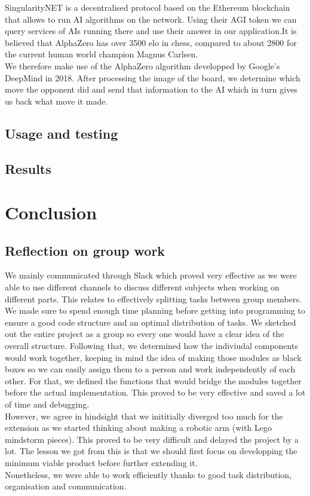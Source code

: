 \documentclass[11pt]{article}
\begin{document}
SingularityNET is a decentralised protocol based on the Ethereum blockchain that
allows to run AI algorithms on the network. Using their AGI token we can query
services of AIs running there and use their answer in our application.It is
believed that AlphaZero has over 3500 elo in chess, compared to about 2800 for
the current human world champion Magnus Carlsen.\\ We therefore make use of the
AlphaZero algorithm developped by Google's DeepMind in 2018. After processing
the image of the board, we determine which move the opponent did and send that
information to the AI which in turn gives us back what move it made.

\subsection{Usage and testing}
\subsection{Results}
\section{Conclusion}
\subsection{Reflection on group work}
We mainly communicated through Slack which proved very effective as we were able
to use different channels to discuss different subjects when working on
different parts. This relates to effectively splitting tasks between group
members. We made sure to spend enough time planning before getting into
programming to ensure a good code structure and an optimal distribution of
tasks. We sketched out the entire project as a group so every one would have a
clear idea of the overall structure. Following that, we determined how the
indiviudal components would work together, keeping in mind the idea of making
those modules as black boxes so we can easily assign them to a person and work
independently of each other. For that, we defined the functions that would
bridge the modules together before the actual implementation. This proved to be
very effective and saved a lot of time and debugging.\\
However, we agree in hindsight that we inititially diverged too much for the
extension as we started thinking about making a robotic arm (with Lego mindstorm
pieces). This proved to be very difficult and delayed the project by a lot. The
lesson we got from this is that we should first focus on developping the minimum
viable product before further extending it.\\
Nonetheless, we were able to work efficiently thanks to good task distribution,
organisation and communication.
\end{document}
